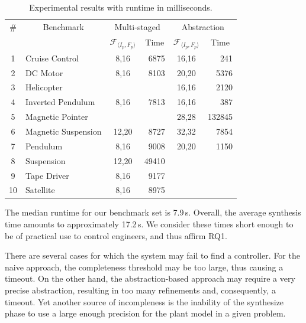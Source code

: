 \documentclass[runningheads,a4paper]{llncs}
\newcommand{\xmark}{\ding{55}}
\begin{document}
\begin{table}
\centering
\scriptsize
\begin{tabular}{| c | l | c | r | c | r |}
\hline
\# & \multicolumn{1}{|c|}{Benchmark}  & \multicolumn{2}{|c|}{Multi-staged}                 & \multicolumn{2}{|c|}{Abstraction} \\
   &                                  & \multicolumn{1}{|c|}{$\mathcal{F}_{\langle I_p,F_p \rangle}$} & \multicolumn{1}{|c|}{Time} & \multicolumn{1}{|c|}{$\mathcal{F}_{\langle I_p,F_p \rangle}$} & \multicolumn{1}{|c|}{Time} \\\hline
1  & Cruise Control      & 8,16   & 6875   & 16,16  & 241    \\
2  & DC Motor            & 8,16   & 8103   & 20,20  & 5376   \\
3  & Helicopter          & \xmark & \xmark & 16,16  & 2120   \\
4  & Inverted Pendulum   & 8,16   & 7813   & 16,16  & 387    \\
5  & Magnetic Pointer    & \xmark & \xmark & 28,28  & 132845 \\
6  & Magnetic Suspension & 12,20  & 8727   & 32,32  & 7854   \\
7  & Pendulum            & 8,16   & 9008   & 20,20  & 1150   \\
8  & Suspension          & 12,20  & 49410  & \xmark & \xmark \\
9  & Tape Driver         & 8,16   & 9177   & \xmark & \xmark \\
10 & Satellite           & 8,16   & 8975   & \xmark & \xmark \\\hline

\end{tabular}
\caption{Experimental results with runtime in milliseconds. \label{tab:results}}
\end{table}

The median runtime for our benchmark set is 7.9\,s.  Overall,
the average synthesis time amounts to approximately 17.2\,s.  We
consider these times short enough to be of practical use to control
engineers, and thus affirm RQ1.  

There are several cases for which the system
may fail to find a controller. For the naive approach, 
the completeness threshold may be too large, thus causing a
timeout.  On the other hand, the abstraction-based approach may
require a very precise abstraction, resulting in too many refinements
and, consequently, a timeout.  Yet another source of incompleness is the inability
of the {\sc synthesize} phase to use a large enough precision for the
plant model in a given problem.
\end{document}
